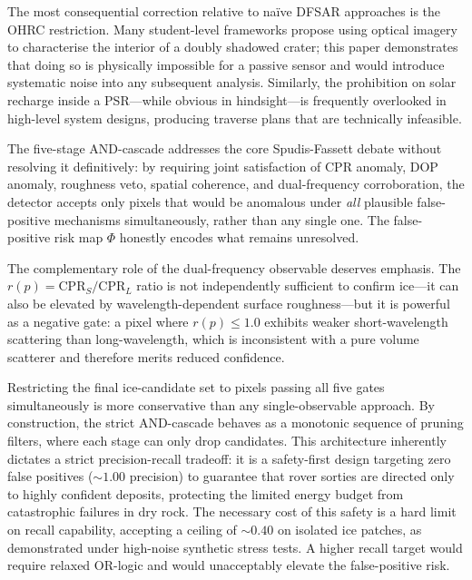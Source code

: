 \documentclass[10pt,conference]{IEEEtran}
\newcommand{\CPR}{\mathrm{CPR}}
\begin{document}
The most consequential correction relative to na{\"i}ve DFSAR approaches
is the OHRC restriction.
Many student-level frameworks propose using optical imagery to
characterise the interior of a doubly shadowed crater; this paper
demonstrates that doing so is physically impossible for a passive sensor
and would introduce systematic noise into any subsequent analysis.
Similarly, the prohibition on solar recharge inside a PSR---while
obvious in hindsight---is frequently overlooked in high-level system
designs, producing traverse plans that are technically infeasible.

The five-stage AND-cascade addresses the core Spudis-Fassett debate
without resolving it definitively: by requiring joint satisfaction of
CPR anomaly, DOP anomaly, roughness veto, spatial coherence, and
dual-frequency corroboration, the detector accepts only pixels that
would be anomalous under \textit{all} plausible false-positive
mechanisms simultaneously, rather than any single one.
The false-positive risk map $\Phi$ honestly encodes what remains
unresolved.

The complementary role of the dual-frequency observable deserves
emphasis.
The $r(p) = \CPR_S / \CPR_L$ ratio is not independently sufficient
to confirm ice---it can also be elevated by wavelength-dependent
surface roughness---but it is powerful as a negative gate: a pixel
where $r(p) \le 1.0$ exhibits weaker short-wavelength scattering
than long-wavelength, which is inconsistent with a pure volume
scatterer and therefore merits reduced confidence.

Restricting the final ice-candidate set to pixels passing all five
gates simultaneously is more conservative than any single-observable
approach. By construction, the strict AND-cascade behaves as a
monotonic sequence of pruning filters, where each stage can only
drop candidates. This architecture inherently dictates a strict
precision-recall tradeoff: it is a safety-first design targeting zero
false positives ($\sim 1.00$ precision) to guarantee that rover sorties
are directed only to highly confident deposits, protecting the limited
energy budget from catastrophic failures in dry rock. The necessary
cost of this safety is a hard limit on recall capability, accepting
a ceiling of $\sim 0.40$ on isolated ice patches, as demonstrated
under high-noise synthetic stress tests. A higher recall target
would require relaxed OR-logic and would unacceptably elevate the
false-positive risk.
\end{document}
